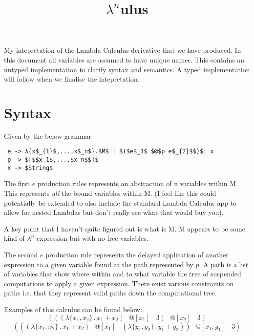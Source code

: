 \documentclass{article}
\title{$\lambda^{n}$ulus}
\date{}
\begin{document}
\maketitle
\vspace{-10mm}
\noindent My intepretation of the Lambda Calculus derivative that we have produced. In this document all variables are assumed to have unique names. This contains an untyped implementation to clarify syntax and semantics. A typed implementation will follow when we finalise the intepretation.
\section{Syntax}
Given by the below grammar

\begin{lstlisting}
 e -> λ{x$_{1}$,...,x$_n$}.$M$ | $($e$_1$ $@$p e$_{2}$$)$| x
 p -> $[$$x_1$,...,$x_n$$]$
 x -> $String$
\end{lstlisting}

\noindent The first $e$ production rules represents an abstraction of n variables within M. This represents \emph{all} the bound variables within M. (I feel like this could potentially be extended to also include the standard Lambda Calculus app to allow for nested Lambdas but don't really see what that would buy you).

\par
\noindent A key point that I haven't quite figured out is what is M. M appears to be some kind of $\lambda^n$-expression but with no free variables.
\par
\noindent The second $e$ production rule represents the delayed application of another expression to a given variable found at the path represented by $p$. A path is a list of variables that show where within and to what variable the tree of suspended computations to apply a given expression. There exist various constraints on paths i.e. that they represent valid paths down the computational tree.
\par
\noindent Examples of this calculus can be found below:
\begin{equation}
    (((\lambda\{x_1, x_2\}\,.\, x_1 + x_2) \>\>\>@[x_1] \>\>\>\>3) \>\>\>@[x_2] \>\>\>\>3)
\end{equation}
\begin{equation}
    (((\lambda\{x_1, x_2\}\,.\, x_1 + x_2) \>\>\>@[x_1] \>\>\>\>(\lambda\{y_1, y_2\}\,.\, y_1 + y_2)) \>\>\>@[x_1, y_1] \>\>\>\>3)
\end{equation}
\end{document}
